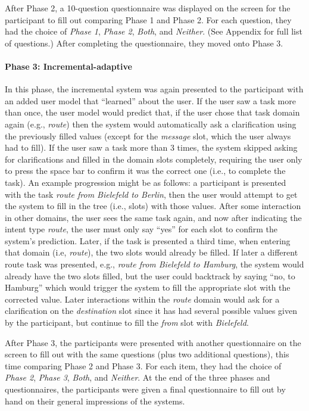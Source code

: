 \documentclass[11pt]{article}
\begin{document}
After Phase 2, a 10-question questionnaire was displayed on the screen for the participant to fill out comparing Phase 1 and Phase 2. For each question, they had the choice of \emph{Phase 1}, \emph{Phase 2}, \emph{Both}, and \emph{Neither}. (See Appendix for full list of questions.) After completing the questionnaire, they moved onto Phase 3.

\paragraph{Phase 3: Incremental-adaptive} In this phase, the incremental system was again presented to the participant with an added user model that ``learned'' about the user. If the user saw a task more than once, the user model would predict that, if the user chose that task domain again (e.g., \emph{route}) then the system would automatically ask a clarification using the previously filled values (except for the \emph{message} slot, which the user always had to fill). If the user saw a task more than 3 times, the system skipped asking for clarifications and filled in the domain slots completely, requiring the user only to press the space bar to confirm it was the correct one (i.e., to complete the task). An example progression might be as follows: a participant is presented with the task \emph{route from Bielefeld to Berlin}, then the user would attempt to get the system to fill in the tree (i.e., slots) with those values. After some interaction in other domains, the user sees the same task again, and now after indicating the intent type \emph{route}, the user must only say ``yes'' for each slot to confirm the system's prediction. Later, if the task is presented a third time, when entering that domain (i.e, \emph{route}), the two slots would already be filled. If later a different route task was presented, e.g., \emph{route from Bielefeld to Hamburg}, the system would already have the two slots filled, but the user could backtrack by saying ``no, to Hamburg'' which would trigger the system to fill the appropriate slot with the corrected value. Later interactions within the \emph{route} domain would ask for a clarification on the \emph{destination} slot since it has had several possible values given by the participant, but continue to fill the \emph{from} slot with \emph{Bielefeld}.

After Phase 3, the participants were presented with another questionnaire on the screen to fill out with the same questions (plus two additional questions), this time comparing Phase 2 and Phase 3. For each item, they had the choice of \emph{Phase 2}, \emph{Phase 3}, \emph{Both}, and \emph{Neither}. At the end of the three phases and questionnaires, the participants were given a final questionnaire to fill out by hand on their general impressions of the systems. 
\end{document}
